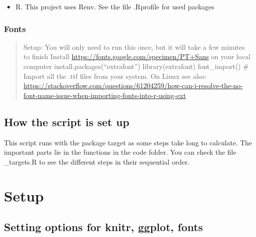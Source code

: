 \documentclass[
]{article}
\newenvironment{Shaded}{\begin{snugshade}}{\end{snugshade}}
\newcommand{\AttributeTok}[1]{\textcolor[rgb]{0.77,0.63,0.00}{#1}}
\newcommand{\CommentTok}[1]{\textcolor[rgb]{0.56,0.35,0.01}{\textit{#1}}}
\newcommand{\ControlFlowTok}[1]{\textcolor[rgb]{0.13,0.29,0.53}{\textbf{#1}}}
\newcommand{\DecValTok}[1]{\textcolor[rgb]{0.00,0.00,0.81}{#1}}
\newcommand{\FunctionTok}[1]{\textcolor[rgb]{0.00,0.00,0.00}{#1}}
\newcommand{\NormalTok}[1]{#1}
\newcommand{\SpecialCharTok}[1]{\textcolor[rgb]{0.00,0.00,0.00}{#1}}
\newcommand{\StringTok}[1]{\textcolor[rgb]{0.31,0.60,0.02}{#1}}
\providecommand{\tightlist}{%
  \setlength{\itemsep}{0pt}\setlength{\parskip}{0pt}}
\begin{document}
\begin{itemize}
\tightlist
\item
  R. This project uses Renv. See the file .Rprofile for used packages
\end{itemize}

\hypertarget{fonts}{%
\subsubsection{Fonts}\label{fonts}}

\begin{quote}
Setup: You will only need to run this once, but it will take a few
minutes to finish Install
\url{https://fonts.google.com/specimen/PT+Sans} on your local computer
install.packages(``extrafont'') library(extrafont) font\_import() \#
Import all the .ttf files from your system. On Linux see also:
\url{https://stackoverflow.com/questions/61204259/how-can-i-resolve-the-no-font-name-issue-when-importing-fonts-into-r-using-ext}
\end{quote}

\hypertarget{how-the-script-is-set-up}{%
\subsection{How the script is set up}\label{how-the-script-is-set-up}}

This script runs with the package target as some steps take long to
calculate. The important parts lie in the functions in the code folder.
You can check the file \_targets.R to see the different steps in their
sequential order.

\hypertarget{setup}{%
\section{Setup}\label{setup}}

\hypertarget{setting-options-for-knitr-ggplot-fonts}{%
\subsection{Setting options for knitr, ggplot,
fonts}\label{setting-options-for-knitr-ggplot-fonts}}

\begin{Shaded}
\end{Shaded}
\end{document}
